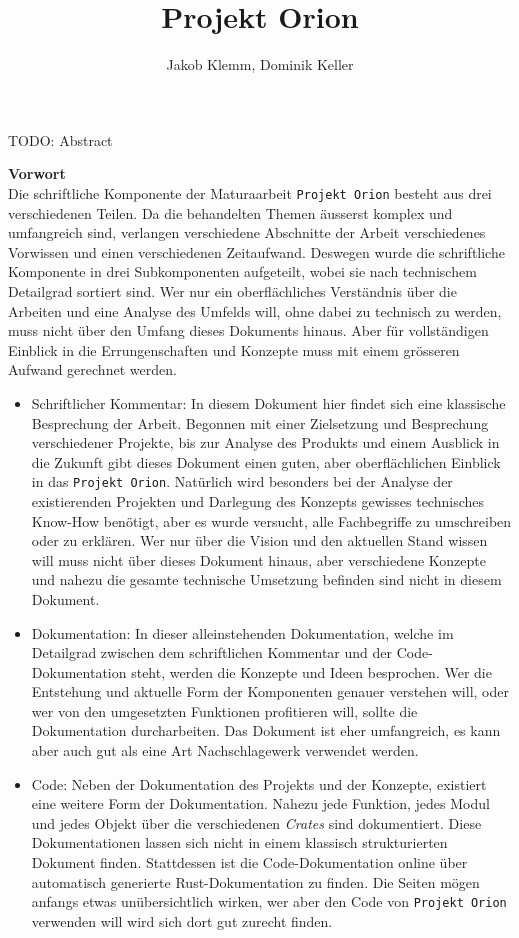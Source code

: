 \documentclass[11pt]{report}
\author{Jakob Klemm, Dominik Keller}
\date{}
\title{Projekt Orion}
\begin{document}
\maketitle
\tableofcontents

\newpage  
\begin{ABSTRACT}
TODO: Abstract
\end{ABSTRACT}
\newpage

\textbf{Vorwort}\\
Die schriftliche Komponente der Maturaarbeit \texttt{Projekt Orion} besteht aus
drei verschiedenen Teilen. Da die behandelten Themen äusserst komplex
und umfangreich sind, verlangen verschiedene Abschnitte der Arbeit
verschiedenes Vorwissen und einen verschiedenen Zeitaufwand. Deswegen
wurde die schriftliche Komponente in drei Subkomponenten aufgeteilt,
wobei sie nach technischem Detailgrad sortiert sind. Wer nur ein
oberflächliches Verständnis über die Arbeiten und eine Analyse des
Umfelds will, ohne dabei zu technisch zu werden, muss nicht über den
Umfang dieses Dokuments hinaus. Aber für vollständigen Einblick in die
Errungenschaften und Konzepte muss mit einem grösseren Aufwand
gerechnet werden.
\begin{itemize}
\item Schriftlicher Kommentar: In diesem Dokument hier findet sich eine
klassische Besprechung der Arbeit. Begonnen mit einer Zielsetzung
und Besprechung verschiedener Projekte, bis zur Analyse des Produkts
und einem Ausblick in die Zukunft gibt dieses Dokument einen guten,
aber oberflächlichen Einblick in das \texttt{Projekt Orion}. Natürlich wird
besonders bei der Analyse der existierenden Projekten und Darlegung
des Konzepts gewisses technisches Know-How benötigt, aber es wurde
versucht, alle Fachbegriffe zu umschreiben oder zu erklären. Wer nur
über die Vision und den aktuellen Stand wissen will muss nicht über
dieses Dokument hinaus, aber verschiedene Konzepte und nahezu die
gesamte technische Umsetzung befinden sind nicht in diesem Dokument.
\item Dokumentation: In dieser alleinstehenden Dokumentation, welche im
Detailgrad zwischen dem schriftlichen Kommentar und der
Code-Dokumentation steht, werden die Konzepte und Ideen besprochen.
Wer die Entstehung und aktuelle Form der Komponenten genauer
verstehen will, oder wer von den umgesetzten Funktionen profitieren
will, sollte die Dokumentation durcharbeiten. Das Dokument ist eher
umfangreich, es kann aber auch gut als eine Art Nachschlagewerk
verwendet werden.
\item Code: Neben der Dokumentation des Projekts und der Konzepte,
existiert eine weitere Form der Dokumentation. Nahezu jede Funktion,
jedes Modul und jedes Objekt über die verschiedenen \emph{Crates} sind
dokumentiert. Diese Dokumentationen lassen sich nicht in einem
klassisch strukturierten Dokument finden. Stattdessen ist die
Code-Dokumentation online über automatisch generierte
Rust-Dokumentation zu finden. Die Seiten mögen anfangs etwas
unübersichtlich wirken, wer aber den Code von \texttt{Projekt Orion}
verwenden will wird sich dort gut zurecht finden.
\end{itemize}
\newpage
\end{document}
